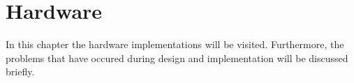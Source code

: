 \chapter{Hardware}
In this chapter the hardware implementations will be visited. Furthermore, the problems that have occured during design and implementation will be discussed briefly. 




